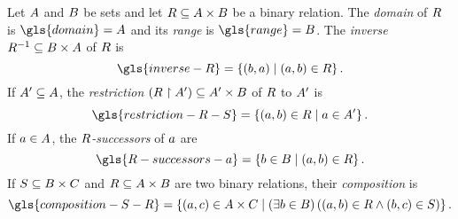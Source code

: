 
Let $A$ and $B$ be sets and let $R\subseteq A\times B$ be a
binary relation.
The \emph{domain} of $R$ is $\gls{domain} = A$ and its \emph{range} is
$\gls{range} = B$.
The \emph{inverse} $R^{-1}\subseteq B\times A$ of $R$ is
\[
  \gls{inverse-R} = 
  \setbd{(\eb, \ea)}{(\ea, \eb) \in \relR}.
\]
If $A'\subseteq A$, the \emph{restriction}
$(R\restriction A') \subseteq A'\times B$ of $R$ to $A'$
is
\[
  \gls{restriction-R-S} =
  \setbd{(\ea, \eb) \in \relR}{\ea \in \setAp}.
\]
If $a \in A$, the \emph{$R$-successors} 
of $a$ are
\[
  \gls{R-successors-a} =
  \setbd{\eb \in \setB}{(\ea, \eb) \in \relR}.
\]
If $S \subseteq B \times C$ and $R \subseteq A \times B$
are two binary relations, their \emph{composition} is 
\[
  \gls{composition-S-R} =
  \setbd{(\ea, \ec) \in \setA \cprod \setC}{
  (\exists \eb \in \setB)\left((\ea, \eb)
  \in \relR \land (\eb, \ec) \in \relS\right)}.
\]